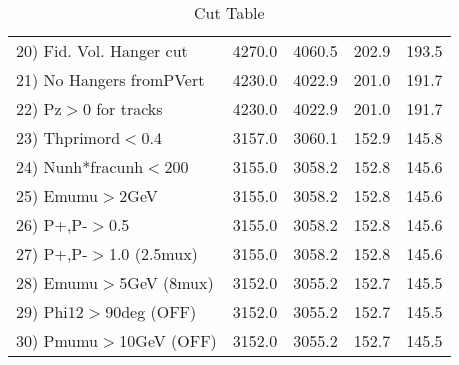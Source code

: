 \begin{table}[h!]
\begin{tabular}{||l||r|r|r|r||}
 20) Fid. Vol. Hanger cut &      4270.0 &      4060.5 &       202.9 &       193.5 \\
 21) No Hangers fromPVert &      4230.0 &      4022.9 &       201.0 &       191.7 \\
 22) Pz$>$0 for tracks    &      4230.0 &      4022.9 &       201.0 &       191.7 \\
 23) Thprimord$<$0.4      &      3157.0 &      3060.1 &       152.9 &       145.8 \\
 24) Nunh*fracunh$<$200   &      3155.0 &      3058.2 &       152.8 &       145.6 \\
 25) Emumu$>$2GeV         &      3155.0 &      3058.2 &       152.8 &       145.6 \\
 26) P+,P-$>$0.5          &      3155.0 &      3058.2 &       152.8 &       145.6 \\
 27) P+,P-$>$1.0 (2.5mux) &      3155.0 &      3058.2 &       152.8 &       145.6 \\
 28) Emumu$>$5GeV  (8mux) &      3152.0 &      3055.2 &       152.7 &       145.5 \\
 29) Phi12$>$90deg  (OFF) &      3152.0 &      3055.2 &       152.7 &       145.5 \\
 30) Pmumu$>$10GeV  (OFF) &      3152.0 &      3055.2 &       152.7 &       145.5 \\
 \hline
 \hline
 \end{tabular}
 \caption{Cut Table \cohrp  }
 \label{tab-cut_crhop}
 \end{table}
